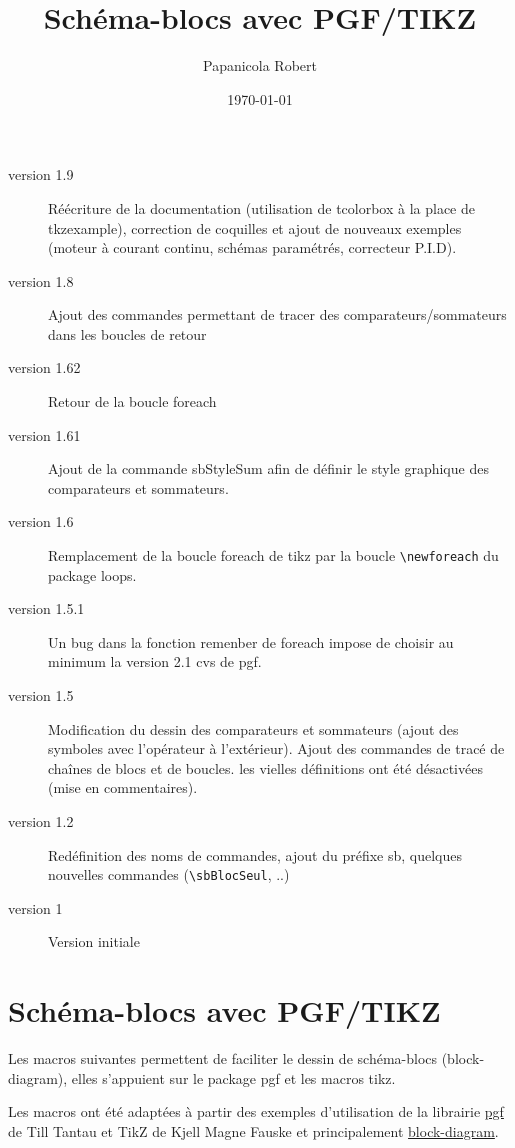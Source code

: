\documentclass[a4paper,11pt]{article}                      %
\title{Schéma-blocs  avec  PGF/TIKZ}                                    %
\author{Papanicola Robert}                                   %
\date{\today}                                     %
\begin{document}
\maketitle

\begin{description}
\item [version 1.9] Réécriture de la documentation (utilisation de tcolorbox à la place de tkzexample), correction de coquilles et ajout de nouveaux exemples (moteur à courant continu, schémas paramétrés, correcteur P.I.D).
\item[version 1.8] Ajout des commandes permettant de tracer des comparateurs/sommateurs dans les boucles de retour
\item[version 1.62] Retour de la boucle foreach
\item[version 1.61] Ajout de la commande sbStyleSum  afin de définir le style graphique des comparateurs et sommateurs.
\item[version 1.6] Remplacement de la boucle foreach de tikz par la boucle \verb"\newforeach" du package loops.
\item [version 1.5.1] Un bug dans la fonction remenber de foreach impose de choisir au minimum la version 2.1 cvs de pgf.
\item [version 1.5] Modification du dessin des comparateurs et sommateurs (ajout des symboles avec l'opérateur à l'extérieur). Ajout des commandes de tracé de chaînes de blocs et de boucles. les vielles définitions ont été désactivées (mise en commentaires).
\item[version 1.2] Redéfinition des noms de commandes, ajout du préfixe sb, quelques nouvelles commandes (\verb"\sbBlocSeul", ..)
\item [version 1] Version initiale
\end{description}


\section{Schéma-blocs  avec  PGF/TIKZ}
Les macros suivantes permettent de faciliter le dessin de schéma-blocs (block-diagram), elles s'appuient sur le package pgf et les macros tikz.

Les macros ont été adaptées à partir des exemples d'utilisation de la librairie  \href{http://www.ctan.org/tex-archive/help/Catalogue/entries/pgf.html}{pgf} de Till Tantau et TikZ de Kjell Magne Fauske et principalement \href{http://www.fauskes.net/pgftikzexamples/tag/block-diagram/}{block-diagram}.
\end{document}
